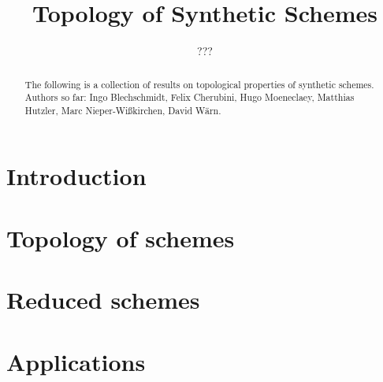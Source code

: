 \documentclass{../util/zariski}
\title{Topology of Synthetic Schemes}
\author{???}
\begin{document}
\maketitle

\begin{abstract}
  The following is a collection of results on topological properties of synthetic schemes.
  Authors so far: Ingo Blechschmidt, Felix Cherubini, Hugo Moeneclaey, Matthias Hutzler, Marc Nieper-Wißkirchen, David Wärn.
\end{abstract}

\tableofcontents

\section*{Introduction}


\section{Topology of schemes}


\section{Reduced schemes}


\section{Applications}


\printindex

\printbibliography
\end{document}
